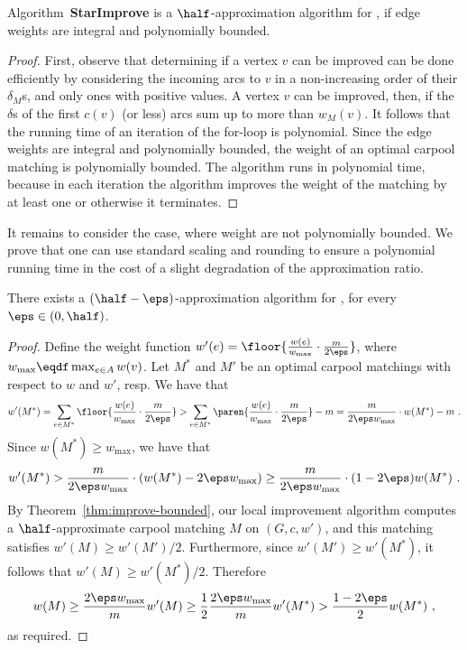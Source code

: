 \begin{theorem}
\label{thm:improve-bounded}
Algorithm~\textbf{StarImprove} is a $\half$-approximation algorithm
for \carpool, if edge weights are integral and polynomially bounded.
\end{theorem}
\begin{proof}
First, observe that determining if a vertex $v$ can be improved can be
done efficiently by considering the incoming arcs to $v$ in a
non-increasing order of their $\delta_M$s, and only ones with positive
values.  A vertex $v$ can be improved, then, if the $\delta$s of the
first $c(v)$ (or less) arcs sum up to more than $w_M(v)$.
%
It follows that the running time of an iteration of the for-loop is
polynomial.  Since the edge weights are integral and polynomially
bounded, the weight of an optimal carpool matching is polynomially
bounded.  The algorithm runs in polynomial time, because in each
iteration the algorithm improves the weight of the matching by at
least one or otherwise it terminates.
\end{proof}

It remains to consider the case, where weight are not polynomially
bounded.  We prove that one can use standard scaling and rounding to
ensure a polynomial running time in the cost of a slight degradation
of the approximation ratio.

\begin{theorem}
\label{thm:improve}
There exists a $(\half-\eps)$-approximation algorithm for \carpool,
for every $\eps \in (0,\half)$.
\end{theorem}
\begin{proof}%
Define the weight function $w'(e)
= \floor{\frac{w(e)}{w_{\max}} \cdot \frac{m}{2\eps}}$, where
$w_{\max} \eqdf \max_{e \in A} w(v)$.
%
Let $M^*$ and $M'$ be an optimal carpool matchings with respect to $w$
and $w'$, resp.  We have that
\[
w'(M^*)
=    \sum_{e \in M^*} \floor{\frac{w(e)}{w_{\max}} \cdot \frac{m}{2\eps}}
>    \sum_{e \in M^*} \paren{ \frac{w(e)}{w_{\max}} \cdot \frac{m}{2\eps} } - m
=    \frac{m}{2\eps w_{\max}} \cdot w(M^*) - m
~.
\]
Since $w(M^*) \geq w_{\max}$, we have that 
\[
w'(M^*)
>    \frac{m}{2\eps w_{\max}} \cdot (w(M^*) - 2\eps w_{\max})
\geq \frac{m}{2\eps w_{\max}} \cdot (1 - 2\eps) w(M^*)
~.
\]
By Theorem~\ref{thm:improve-bounded}, our local improvement algorithm computes a
$\half$-approximate carpool matching $M$ on $(G, c, w')$, and this
matching satisfies $w'(M) \geq w'(M')/2$.  Furthermore, since
$w'(M') \geq w'(M^*)$, it follows that $w'(M) \geq w'(M^*)/2$.
Therefore
\[
w(M)
\geq \frac{2\eps w_{\max}}{m} w'(M) 
\geq \frac{1}{2} \frac{2\eps w_{\max}}{m} w'(M^*)
>    \frac{1-2\eps}{2} w(M^*)
~,
\]
as required.
\end{proof}


